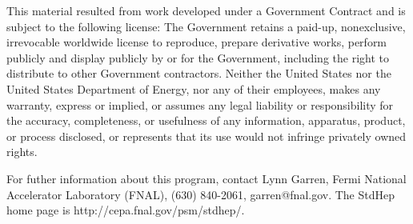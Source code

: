 This material resulted from work developed under a Government Contract
and is subject to the following license:  The Government retains a
paid-up, nonexclusive, irrevocable worldwide license to reproduce,
prepare derivative works, perform publicly and display publicly by or for
the Government,  including the right to distribute to other Government
contractors.  Neither the United States nor the United States Department
of Energy, nor any of their employees, makes any warranty, express or
implied, or assumes any legal liability or responsibility for the
accuracy, completeness, or usefulness of any  information, apparatus,
product, or process disclosed, or represents that its use would not
infringe privately owned rights.
 
For futher information about this program, contact Lynn Garren,
Fermi National Accelerator Laboratory (FNAL), (630) 840-2061,
garren@fnal.gov.  The StdHep home page is http://cepa.fnal.gov/psm/stdhep/.

\newpage

\setcounter{page}{1}
\tableofcontents

\cleardoublepage
